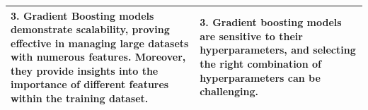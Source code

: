 \begin{table}[H]
\begin{tabularx}{\textwidth}{X|X}
        3. Gradient Boosting models demonstrate scalability, proving effective in managing large datasets with numerous features. Moreover, they provide insights into the importance of different features within the training dataset. & 3. Gradient boosting models are sensitive to their hyperparameters, and selecting the right combination of hyperparameters can be challenging.                           \\
        \hline
    \end{tabularx}
\end{table}
\FloatBarrier




